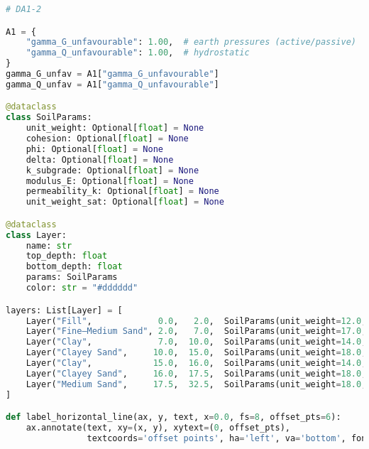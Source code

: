 \begin{lstlisting}[language=Python]
# DA1-2

A1 = {
    "gamma_G_unfavourable": 1.00,  # earth pressures (active/passive)
    "gamma_Q_unfavourable": 1.00,  # hydrostatic
}
gamma_G_unfav = A1["gamma_G_unfavourable"]
gamma_Q_unfav = A1["gamma_Q_unfavourable"]

@dataclass
class SoilParams:
    unit_weight: Optional[float] = None
    cohesion: Optional[float] = None
    phi: Optional[float] = None
    delta: Optional[float] = None
    k_subgrade: Optional[float] = None
    modulus_E: Optional[float] = None
    permeability_k: Optional[float] = None
    unit_weight_sat: Optional[float] = None

@dataclass
class Layer:
    name: str
    top_depth: float
    bottom_depth: float
    params: SoilParams
    color: str = "#dddddd"

layers: List[Layer] = [
    Layer("Fill",             0.0,   2.0,  SoilParams(unit_weight=12.0, cohesion=20/1.40, phi=12.1, unit_weight_sat=12.0)),
    Layer("Fine–Medium Sand", 2.0,   7.0,  SoilParams(unit_weight=17.0, cohesion=0,  phi=24.8,   unit_weight_sat=19.0)),
    Layer("Clay",             7.0,  10.0,  SoilParams(unit_weight=14.0, cohesion=25/1.40, phi=14.2, unit_weight_sat=14.0)),
    Layer("Clayey Sand",     10.0,  15.0,  SoilParams(unit_weight=18.0, cohesion=0,  phi=20.5,   unit_weight_sat=20.0)),
    Layer("Clay",            15.0,  16.0,  SoilParams(unit_weight=14.0, cohesion=25/1.40, phi=14.2, unit_weight_sat=14.0)),
    Layer("Clayey Sand",     16.0,  17.5,  SoilParams(unit_weight=18.0, cohesion=0,  phi=20.5,   unit_weight_sat=20.0)),
    Layer("Medium Sand",     17.5,  32.5,  SoilParams(unit_weight=18.0, cohesion=0,  phi=27.0, unit_weight_sat=20.0)),
]

def label_horizontal_line(ax, y, text, x=0.0, fs=8, offset_pts=6):
    ax.annotate(text, xy=(x, y), xytext=(0, offset_pts),
                textcoords='offset points', ha='left', va='bottom', fontsize=fs, color='black')


\end{lstlisting}
